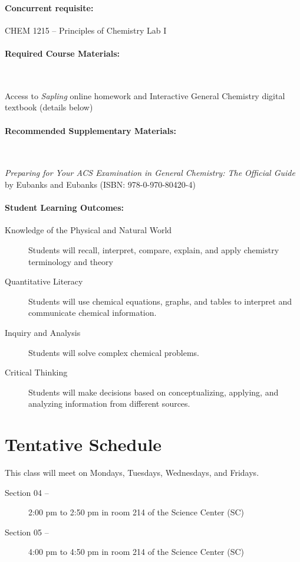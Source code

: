 \documentclass[12pt, letterpaper]{article}
\begin{document}
\paragraph{Concurrent requisite:}
CHEM 1215 -- Principles of Chemistry Lab I

\paragraph{Required Course Materials:} ~

Access to \emph{Sapling} online homework and Interactive General Chemistry digital textbook (details below)

\paragraph{Recommended Supplementary Materials:} ~

\emph{Preparing for Your ACS Examination in General Chemistry: The Official Guide} by Eubanks and Eubanks (ISBN: 978-0-970-80420-4)

\paragraph{Student Learning Outcomes:}
\begin{description}
  \item[Knowledge of the Physical and Natural World] Students will recall, interpret, compare, explain, and apply chemistry terminology and theory
  \item[Quantitative Literacy] Students will use chemical equations, graphs, and tables to interpret and communicate chemical information.
  \item[Inquiry and Analysis] Students will solve complex chemical problems.
  \item[Critical Thinking] Students will make decisions based on conceptualizing, applying, and analyzing information from different sources.
\end{description}

\section*{Tentative Schedule}
This class will meet on Mondays, Tuesdays, Wednesdays, and Fridays.
\begin{description}
	\item[Section 04 --] 2:00 pm to 2:50 pm in room 214 of the Science Center (SC)
	\item[Section 05 --] 4:00 pm to 4:50 pm in room 214 of the Science Center (SC)
\end{description}
\end{document}
